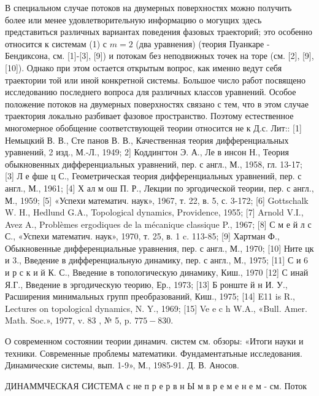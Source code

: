 \documentclass[10pt]{article}
\begin{document}
В специальном случае потоков на двумерных поверхностях можно получить более или менее удовлетворительную информацию о могущих здесь представиться различных вариантах поведения фазовых траекторий; это особенно относится к системам (1) с $m=2$ (два уравнения) (теория Пуанкаре - Бендиксона, см. [1]-[3], [9]) и потокам без неподвижных точек на торе (см. [2], [9], [10]). Однако при этом остается открытым вопрос, как именно ведут себя траектории той или иной конкретной системы. Большое число работ посвящено исследованию последнего вопроса для различных классов уравнений. Особое положение потоков на двумерных поверхностях связано с тем, что в этом случае траектория локально разбивает фазовое пространство. Поэтому естественное многомерное обобщение соответствующей теории относится не к Д.с. Лит:: [1] Немыцкий В. В., Сте панов В. В., Качественная теория дифференциальных уравнений, 2 изд., М.-Л., 1949; 2] Коддингтон Э. А., Ле в инсон Н., Теория обыкновенных дифференциальных уравнений, пер. с англ., М., 1958, гл. 13-17; [3] Л е фше ц С., Геометрическая теория дифференциальных уравнений, пер. с англ., М., 1961; [4] Х ал м ош П. Р., Лекции по эргодической теории, пер. с англ., М., 1959; [5] «Успехи математич. наук», 1967, т. 22, в. 5, с. 3-172; [6] Gottschalk W. H., Hedlund G.A., Topological dynamics, Providence, 1955; [7] Arnold V.I., Avez A., Problèmes ergodiques de la mécanique classique P., 1967; [8] С м е й л с С., «Успехи математич. наук», 1970, т. 25, в. 1 c. 113-85; [9] Хартман Ф., Обыкновенные дифференциальные уравнения, пер. с англ., М., 1970; [10] Ните цк и 3., Введение в дифференциальную динамику, пер. с англ., М., 1975; [11] С и 6 и р с к и й К. С., Введение в топологическую динамику, Киш., 1970 [12] С инай Я.Г., Введение в эргодическую теорию, Ер., 1973; [13] Б ронште й н И. У., Расширения минимальных групп преобразований, Киш., 1975; [14] E11 is R., Lectures on topological dynamics, N. Y., 1969; [15] Ve e c h W.A., «Bull. Amer. Math. Soc.», 1977, v. 83 , № 5, p. $775-830$.



О современном состоянии теории динамич. систем см. обзоры: «Итоги науки и техники. Современные проблемы математики. Фундаментатьные исследования. Динамические системы, вып. 1-9», М., 1985-91. Д. В. Аносов.



ДИНАММЧЕСКАЯ СИСТЕМА с не п р е р в н Ы м в р е м е н е м - см. Поток
\end{document}

